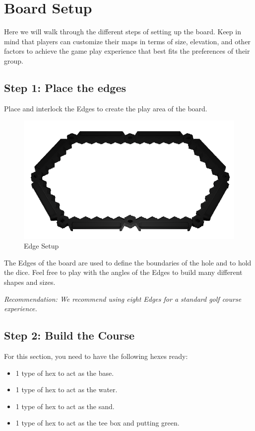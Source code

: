 \documentclass[../main.tex]{subfiles}
\begin{document}
\section{Board Setup}
Here we will walk through the different steps of setting up the board. Keep in mind that players can customize their maps in terms of size, elevation, and other factors to achieve the game play experience that best fits the preferences of their group.


\subsection{Step 1: Place the edges}
Place and interlock the Edges to create the play area of the board.

\begin{figure}[h]
    \centering
    \includegraphics[width=1\linewidth]{chapters//boardsetup/Source Golf Edge Setup.png}
    \caption{Edge Setup}
\end{figure}

The Edges of the board are used to define the boundaries of the hole and to hold the dice. Feel free to play with the angles of the Edges to build many different shapes and sizes.



\textit{Recommendation: We recommend using eight Edges for a standard golf course experience.}

\subsection{Step 2: Build the Course}
For this section, you need to have the following hexes ready: 
\begin{itemize}
    \item 1 type of hex to act as the base.
    \item 1 type of hex to act as the water.
    \item 1 type of hex to act as the sand.
    \item 1 type of hex to act as the tee box and putting green. 
\end{itemize}
\end{document}
